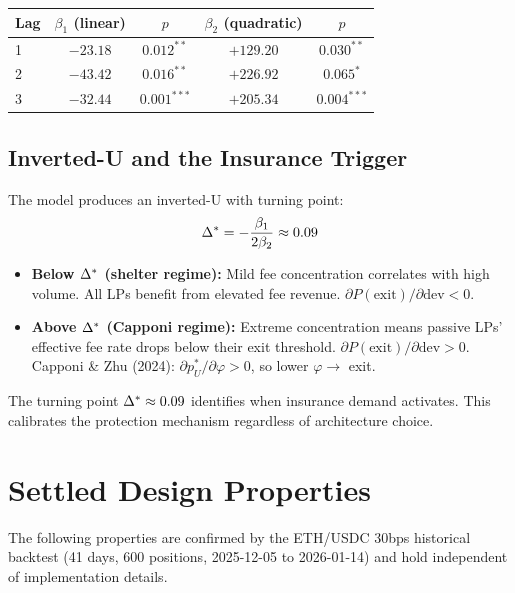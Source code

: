 \begin{center}
\begin{tabular}{@{}lcccc@{}}
\toprule
Lag & $\beta_1$ (linear) & $p$ & $\beta_2$ (quadratic) & $p$ \\
\midrule
1 & $-23.18$ & $0.012^{**}$ & $+129.20$ & $0.030^{**}$ \\
2 & $-43.42$ & $0.016^{**}$ & $+226.92$ & $0.065^{*}$ \\
3 & $-32.44$ & $0.001^{***}$ & $+205.34$ & $0.004^{***}$ \\
\bottomrule
\end{tabular}
\end{center}

\subsection{Inverted-U and the Insurance Trigger}

The model produces an inverted-U with turning point:
\begin{equation}\label{eq:turning-point}
  \Delta^{*} = -\frac{\beta_1}{2\beta_2} \approx 0.09
\end{equation}

\begin{itemize}
  \item \textbf{Below $\Delta^{*}$ (shelter regime):} Mild fee concentration correlates with
    high volume. All LPs benefit from elevated fee revenue. $\partial P(\text{exit})/\partial \text{dev} < 0$.
  \item \textbf{Above $\Delta^{*}$ (Capponi regime):} Extreme concentration means passive LPs'
    effective fee rate drops below their exit threshold.
    $\partial P(\text{exit})/\partial \text{dev} > 0$.
    Capponi \& Zhu (2024): $\partial p^*_U/\partial \varphi > 0$, so lower $\varphi \to$ exit.
\end{itemize}

The turning point $\Delta^{*} \approx 0.09$ identifies when insurance demand activates.
This calibrates the protection mechanism regardless of architecture choice.

\section{Settled Design Properties}\label{sec:design-properties}

The following properties are confirmed by the ETH/USDC 30bps historical backtest
(41 days, 600 positions, 2025-12-05 to 2026-01-14) and hold independent of
implementation details.

